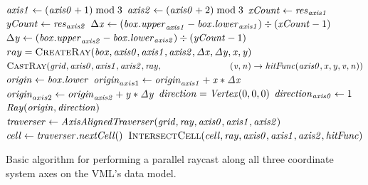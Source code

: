 \begin{algorithm}
	\centering
	\begin{algorithmic}[1]
				\State $\mathit{axis1} \gets (\mathit{axis0} + 1) \bmod 3$
				\State $\mathit{axis2} \gets (\mathit{axis0} + 2) \bmod 3$
				\State $\mathit{xCount} \gets \mathit{res}_{\mathit{axis1}}$
				\State $\mathit{yCount} \gets \mathit{res}_{\mathit{axis2}}$
				\State $\Delta \mathit{x} \gets (\mathit{box}.\mathit{upper}_{\mathit{axis1}} - \mathit{box}.\mathit{lower}_{\mathit{axis1}}) \div (\mathit{xCount} - 1)$
				\State $\Delta \mathit{y} \gets (\mathit{box}.\mathit{upper}_{\mathit{axis2}} - \mathit{box}.\mathit{lower}_{\mathit{axis2}}) \div (\mathit{yCount} - 1)$
						\State $ray = \Call{CreateRay}{\var{box}, \var{axis0}, \var{axis1}, \var{axis2}, \var{\Delta x}, \var{\Delta y}, \var{x}, \var{y}}$
						\State $\Call{CastRay}{\var{grid}, \var{axis0}, \var{axis1}, \var{axis2}, \var{ray},\hfill\break
							\hspace*{\dimexpr\algorithmicindent*5}(\var{v}, \var{n}) \rightarrow \var{hitFunc}(\var{axis0}, \var{x}, \var{y}, \var{v}, \var{n})}$
					\EndFor
				\EndFor
			\EndFor
		\EndProcedure
		\\
			\State $\mathit{origin} \gets \mathit{box}.\mathit{lower}$
			\State $\mathit{origin}_{axis1} \gets \mathit{origin}_{\mathit{axis1}} + \mathit{x} * \mathit{\Delta x}$
			\State $\mathit{origin}_{axis2} \gets \mathit{origin}_{\mathit{axis2}} + \mathit{y} * \mathit{\Delta y}$
			\State $\mathit{direction} = \mathit{Vertex}(0, 0, 0)$
			\State $\mathit{direction}_{\mathit{axis0}} \gets 1$
			\State \Return $\mathit{Ray}(\mathit{origin}, \mathit{direction})$
		\EndFunction
		\\
			\State $\mathit{traverser} \gets \mathit{AxisAlignedTraverser}(\mathit{grid}, \mathit{ray}, \mathit{axis0}, \mathit{axis1}, \mathit{axis2})$
				\State $\mathit{cell} \gets \mathit{traverser}.\mathit{nextCell}()$
				\State $\Call{IntersectCell}{\var{cell}, \var{ray}, \var{axis0}, \var{axis1}, \var{axis2}, \var{hitFunc}}$
			\EndWhile
		\EndProcedure
	\end{algorithmic}
	\caption{
		Basic algorithm for performing a parallel raycast along all three coordinate system axes on the VML's data model.
	}
	\label{alg:tri_dexel_raycast}
\end{algorithm}
